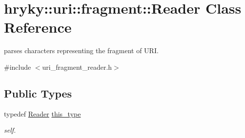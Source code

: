 \hypertarget{classhryky_1_1uri_1_1fragment_1_1_reader}{\section{hryky\-:\-:uri\-:\-:fragment\-:\-:Reader Class Reference}
\label{classhryky_1_1uri_1_1fragment_1_1_reader}
}


parses characters representing the fragment of U\-R\-I.  




{\ttfamily \#include $<$uri\-\_\-fragment\-\_\-reader.\-h$>$}

\subsection*{Public Types}
\begin{DoxyCompactItemize}
\item 
\hypertarget{classhryky_1_1uri_1_1fragment_1_1_reader_ae537bbb2c10b19dc5e44b148a67132f0}{typedef \hyperlink{classhryky_1_1uri_1_1fragment_1_1_reader}{Reader} \hyperlink{classhryky_1_1uri_1_1fragment_1_1_reader_ae537bbb2c10b19dc5e44b148a67132f0}{this\-\_\-type}}\label{classhryky_1_1uri_1_1fragment_1_1_reader_ae537bbb2c10b19dc5e44b148a67132f0}

\begin{DoxyCompactList}\small\item\em self. \end{DoxyCompactList}\end{DoxyCompactItemize}
